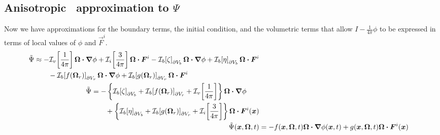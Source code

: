 \subsection{Anisotropic \Pone\ approximation to \texorpdfstring{$\Psi$}{Psi}}

Now we have approximations for the boundary terms, the initial condition, and
the volumetric terms that allow $I-\frac{1}{4\pi}\phi$ to be expressed in terms
of local values of $\phi$ and $\vec{F}^i$.
\begin{align} \nonumber
\begin{split}
 \tilde\Psi
 &\approx 
 - \lopinv{v}{\frac{1}{4\pi}} \vec{\Omega}\vd \grad \phi
 + \lopinv{i}{\frac{3}{4\pi}} \vec{\Omega}\vd \vec{F}^i
 - \lopinv{b}{\zeta}_{\partial V_b} \vec{\Omega}\vd \grad \phi
 + \lopinv{b}{\eta}_{\partial V_b} \vec{\Omega}\vd \vec{F}^i
 \\&\qquad
 - \lopinv{b}{f(\vec{\Omega}_r)}_{\partial V_r} \vec{\Omega}\vd \grad \phi
 + \lopinv{b}{g(\vec{\Omega}_r)}_{\partial V_r} \vec{\Omega}\vd \vec{F}^i
\end{split}
\\
\begin{split}
 \tilde\Psi &= 
- \left\{
  \lopinv{b}{\zeta}_{\partial V_b} 
+ \lopinv{b}{f(\vec{\Omega}_r)}_{\partial V_r}
+ \lopinv{v}{\frac{1}{4\pi}}
\right\} \vec{\Omega}\vd \grad \phi
 \\&\qquad
+ \left\{
  \lopinv{b}{\eta}_{\partial V_b} 
+ \lopinv{b}{g(\vec{\Omega}_r)}_{\partial V_r}
+ \lopinv{i}{\frac{3}{4\pi}}
\right\} \vec{\Omega}\vd \vec{F}^i(\vec{x})
\end{split}
\\ \label{eq:ap1approxPsi3}
\tilde\Psi(\vec{x}, \vec{\Omega}, t)
&= - f(\vec{x}, \vec{\Omega}, t) \vec{\Omega}\vd \grad \phi(\vec{x}, t)
+ g(\vec{x}, \vec{\Omega}, t) \vec{\Omega}\vd \vec{F}^i(\vec{x})
\end{align}

